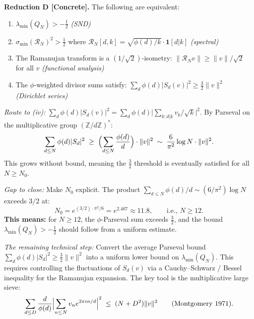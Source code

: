 \documentclass[12pt]{article}
\newcommand{\half}{\tfrac{1}{2}}
\begin{document}
\begin{tcolorbox}[keybox]
\textbf{Reduction D [Concrete].}
The following are equivalent:
\begin{enumerate}[itemsep=3pt]
  \item $\lambda_{\min}(Q_N) > -\half$ \hfill \textit{(SND)}
  \item $\sigma_{\min}(\mathcal{R}_N)^2 > \half$
        where $\mathcal{R}_N[d,k] = \sqrt{\phi(d)/k}\cdot\mathbf{1}[d|k]$
        \hfill \textit{(spectral)}
  \item The Ramanujan transform is a $(1/\sqrt{2})$-isometry:
        $\|\mathcal{R}_N v\| \ge \|v\|/\sqrt{2}$ for all $v$
        \hfill \textit{(functional analysis)}
  \item The $\phi$-weighted divisor sums satisfy:
        $\sum_d \phi(d)|S_d(v)|^2 \ge \frac{3}{2}\|v\|^2$
        \hfill \textit{(Dirichlet series)}
\end{enumerate}

\textit{Route to (iv):}
$\sum_d \phi(d)|S_d(v)|^2 = \sum_d \phi(d) \bigl|\sum_{k: d|k} v_k/\sqrt{k}\bigr|^2$.
By Parseval on the multiplicative group $(\mathbb{Z}/d\mathbb{Z})^*$:
\[
  \sum_{d\le N}\phi(d)|S_d|^2
  \;\ge\; \Bigl(\sum_{d\le N}\frac{\phi(d)}{d}\Bigr)\cdot\|v\|^2
  \;\sim\; \frac{6}{\pi^2}\log N \cdot \|v\|^2.
\]
This grows without bound, meaning the $\frac{3}{2}$ threshold is eventually
satisfied for all $N \ge N_0$.

\textit{Gap to close:} Make $N_0$ explicit.
The product $\sum_{d\le N}\phi(d)/d \sim (6/\pi^2)\log N$ exceeds $3/2$ at:
\[
  N_0 = e^{(3/2)\cdot\pi^2/6} = e^{2.467} \approx 11.8,
  \qquad \text{i.e., } N \ge 12.
\]
\textbf{This means:} for $N \ge 12$, the $\phi$-Parseval sum exceeds $\frac{3}{2}$,
and the bound $\lambda_{\min}(Q_N) > -\half$ should follow from a uniform estimate.

\textit{The remaining technical step:} Convert the average Parseval bound
$\sum_d \phi(d)|S_d|^2 \ge \frac{3}{2}\|v\|^2$
into a uniform lower bound on $\lambda_{\min}(Q_N)$.
This requires controlling the fluctuations of $S_d(v)$ via
a Cauchy--Schwarz / Bessel inequality for the Ramanujan expansion.
The key tool is the multiplicative large sieve:
\[
  \sum_{d \le D} \frac{d}{\phi(d)}
  \Bigl|\sum_{n\le N} v_n e^{2\pi i n/d}\Bigr|^2
  \;\le\; (N + D^2)\|v\|^2 \qquad \text{(Montgomery 1971).}
\]
\end{tcolorbox}
\end{document}
